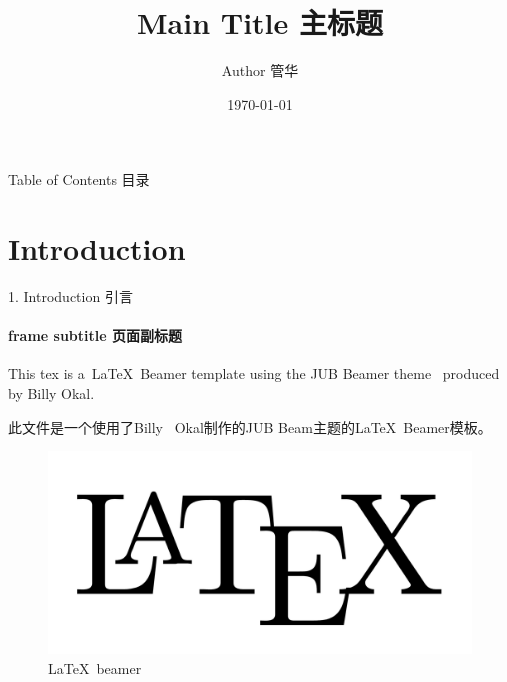 \documentclass{ctexbeamer}
\begin{document}
  \title{Main Title 主标题}
  \author{Author 管华}
  \date{\today}

  \begin{frame}[plain,t]
      \titlepage
  \end{frame} %

  \begin{frame}{Table of Contents 目录}
      \tableofcontents
  \end{frame} %

  \section{Introduction}
  \label{Sec:introduction}
  \begin{frame}{1. Introduction 引言}
      \framesubtitle{frame subtitle 页面副标题}
      This tex is a~\LaTeX\ Beamer template using the JUB Beamer theme~\cite{JUBTheme} produced by Billy Okal.

      \bigskip

      此文件是一个使用了Billy~ Okal制作的JUB Beam主题\cite{JUBTheme}的\LaTeX \ Beamer模板。

      \begin{figure}
          \begin{center}
              \includegraphics[scale=0.1]{latex.png}
          \end{center}
          \caption{\LaTeX \ beamer}
          \label{Fig:latex_beamer}
      \end{figure}
  \end{frame} %
\end{document}
